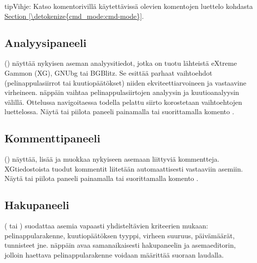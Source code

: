 \documentclass[letterpaper,10pt,finnish]{sphinxmanual}
\begin{document}
\begin{sphinxadmonition}{tip}{Vihje:}
\sphinxAtStartPar
Katso komentorivillä käytettävissä olevien komentojen luettelo kohdasta \hyperref[\detokenize{cmd_mode:cmd-mode}]{Section \ref{\detokenize{cmd_mode:cmd-mode}}}.
\end{sphinxadmonition}


\subsection{Analyysipaneeli}
\label{\detokenize{manuel:panneau-analyse}}\label{\detokenize{manuel:id3}}
\sphinxAtStartPar
{} () näyttää nykyisen aseman analyysitiedot, jotka on tuotu lähteistä eXtreme Gammon (XG), GNUbg tai BGBlitz. Se esittää parhaat vaihtoehdot (pelinappulasiirrot tai kuutiopäätökset) niiden ekviteettiarvoineen ja vastaavine virheineen. \sphinxhyphen{}näppäin vaihtaa pelinappulasiirtojen analyysin ja kuutioanalyysin välillä. Ottelussa navigoitaessa todella pelattu siirto korostetaan vaihtoehtojen luettelossa. Näytä tai piilota paneeli painamalla  tai suorittamalla komento .


\subsection{Kommenttipaneeli}
\label{\detokenize{manuel:panneau-commentaires}}\label{\detokenize{manuel:id4}}
\sphinxAtStartPar
{} () näyttää, lisää ja muokkaa nykyiseen asemaan liittyviä kommentteja. XG\sphinxhyphen{}tiedostoista tuodut kommentit liitetään automaattisesti vastaaviin asemiin. Näytä tai piilota paneeli painamalla  tai suorittamalla komento .


\subsection{Hakupaneeli}
\label{\detokenize{manuel:panneau-recherche}}\label{\detokenize{manuel:id5}}
\sphinxAtStartPar
{} ( tai ) suodattaa asemia vapaasti yhdisteltävien kriteerien mukaan: pelinappularakenne, kuutiopäätöksen tyyppi, virheen suuruus, päivämäärät, tunnisteet jne. \sphinxhyphen{}näppäin avaa samanaikaisesti hakupaneelin ja asemaeditorin, jolloin haettava pelinappularakenne voidaan määrittää suoraan laudalla.
\end{document}
